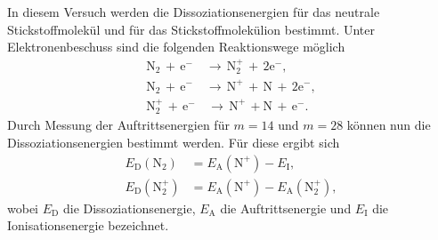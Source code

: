 In diesem Versuch werden die Dissoziationsenergien für das neutrale Stickstoffmolekül und für das Stickstoffmolekülion bestimmt. Unter Elektronenbeschuss sind die folgenden Reaktionswege möglich
\begin{align}
\textrm{N}_{2} \, + \, \textrm{e}^{-} \, &\to \, \textrm{N}_{2}^{+} \, + \, 2\textrm{e}^{-}, \\
\textrm{N}_{2} \, + \, \textrm{e}^{-} \, &\to \, \textrm{N}^{+} \, + \, \textrm{N} \, + \, 2\textrm{e}^{-}, \\
\textrm{N}_{2}^{+} \, + \, \textrm{e}^{-} &\, \to \, \textrm{N}^{+} \, + \textrm{N} \, + \, \textrm{e}^{-}.
\end{align}
Durch Messung der Auftrittsenergien für $m=14$ und $m=28$ können nun die Dissoziationsenergien bestimmt werden. Für diese ergibt sich
\begin{align*}
E_{\textrm{D}}(\textrm{N}_{2}) &= E_{\textrm{A}}(\textrm{N}^{+}) - E_{\textrm{I}}, \\
E_{\textrm{D}}(\textrm{N}_{2}^{+}) &= E_{\textrm{A}}(\textrm{N}^{+}) - E_{\textrm{A}}(\textrm{N}_{2}^{+}),
\end{align*}
wobei $E_{\textrm{D}}$ die Dissoziationsenergie, $E_{\textrm{A}}$ die Auftrittsenergie und $E_{\textrm{I}}$ die Ionisationsenergie bezeichnet.\\


